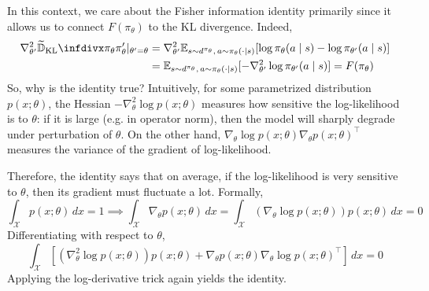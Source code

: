 \documentclass[11pt, letterpaper]{article}
\begin{document}
\begin{remark}
    In this context, we care about the Fisher information identity primarily since it allows us to connect \(F(\pi_\theta)\) to the KL divergence. Indeed, 
    \begin{align*}
        \nabla_{\theta'}^2 \TKL{\pi_\theta}{\pi_\theta'} \rvert_{\theta' = \theta}
        &= \nabla_{\theta'}^2 \mathbb{E}_{s \sim d^{\pi_\theta},\, a \sim \pi_\theta(\cdot \mid s)}[\log \pi_\theta(a \mid s) - \log \pi_{\theta'}(a \mid s)] \\
        &= \mathbb{E}_{s \sim d^{\pi_\theta},\, a \sim \pi_\theta(\cdot \mid s)}[-\nabla_{\theta'}^2 \log \pi_{\theta'}(a \mid s)]
        = F(\pi_\theta)
    \end{align*}
    So, why is the identity true? Intuitively, for some parametrized distribution \(p(x; \theta)\), the Hessian \(-\nabla_\theta^2 \log p(x; \theta)\) measures how sensitive the log-likelihood is to \(\theta\): if it is large (e.g. in operator norm), then the model will sharply degrade under perturbation of \(\theta\). On the other hand, \(\nabla_\theta \log p(x; \theta) \nabla_\theta p(x; \theta)^\top\) measures the variance of the gradient of log-likelihood. 

    Therefore, the identity says that on average, if the log-likelihood is very sensitive to \(\theta\), then its gradient must fluctuate a lot. Formally,
    \[
        \int_{\mathcal{X}} p(x; \theta) \,dx = 1
        \implies 
        \int_{\mathcal{X}} \nabla_\theta p(x; \theta) \,dx
        = \int_{\mathcal{X}} (\nabla_\theta \log p(x; \theta)) p(x; \theta) \,dx 
        = 0
    \]
    Differentiating with respect to \(\theta\), 
    \[
        \int_{\mathcal{X}} [(\nabla_\theta^2 \log p(x; \theta)) p(x; \theta) + \nabla_\theta p(x; \theta) \nabla_\theta \log p(x; \theta)^\top] \,dx
        = 0
    \]
    Applying the log-derivative trick again yields the identity. 
\end{remark}
\end{document}
